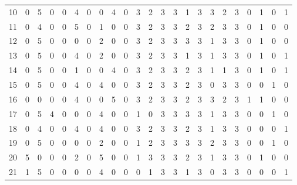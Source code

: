 \begin{table}[htbp]
{\begin{tabular}{lllllllllllllllllllllll}
10                  & 0 & 5 & 0 & 0 & 4 & 0 & 0 & 4 & 0 & 3 & 2 & 3 & 3 & 1 & 3 & 3 & 2 & 3 & 0                  & 1                   & 0                   & 1                   \\
11                  & 0 & 4 & 0 & 0 & 5 & 0 & 1 & 0 & 0 & 3 & 2 & 3 & 3 & 2 & 3 & 2 & 3 & 3 & 0                  & 1                   & 0                   & 0                   \\
12                  & 0 & 5 & 0 & 0 & 0 & 0 & 2 & 0 & 0 & 3 & 2 & 3 & 3 & 3 & 3 & 1 & 3 & 3 & 0                  & 1                   & 0                   & 0                   \\
13                  & 0 & 5 & 0 & 0 & 4 & 0 & 2 & 0 & 0 & 3 & 2 & 3 & 3 & 1 & 3 & 1 & 3 & 3 & 0                  & 1                   & 0                   & 1                   \\
14                  & 0 & 5 & 0 & 0 & 1 & 0 & 0 & 4 & 0 & 3 & 2 & 3 & 3 & 2 & 3 & 1 & 1 & 3 & 0                  & 1                   & 0                   & 1                   \\
15                  & 0 & 5 & 0 & 0 & 4 & 0 & 4 & 0 & 0 & 3 & 2 & 3 & 3 & 2 & 3 & 0 & 3 & 3 & 0                  & 0                   & 1                   & 0                   \\
16                  & 0 & 0 & 0 & 0 & 4 & 0 & 0 & 5 & 0 & 3 & 2 & 3 & 3 & 2 & 3 & 3 & 2 & 3 & 1                  & 1                   & 0                   & 0                   \\
17                  & 0 & 5 & 4 & 0 & 0 & 0 & 4 & 0 & 0 & 1 & 0 & 3 & 3 & 3 & 3 & 1 & 3 & 3 & 0                  & 0                   & 1                   & 0                   \\
18                  & 0 & 4 & 0 & 0 & 4 & 0 & 4 & 0 & 0 & 3 & 2 & 3 & 3 & 2 & 3 & 1 & 3 & 3 & 0                  & 0                   & 0                   & 1                   \\
19                  & 0 & 5 & 0 & 0 & 0 & 0 & 2 & 0 & 0 & 1 & 2 & 3 & 3 & 3 & 3 & 2 & 3 & 3 & 0                  & 0                   & 1                   & 0                   \\
20                  & 5 & 0 & 0 & 0 & 2 & 0 & 5 & 0 & 0 & 1 & 3 & 3 & 3 & 2 & 3 & 1 & 3 & 3 & 0                  & 1                   & 0                   & 0                   \\
21                  & 1 & 5 & 0 & 0 & 0 & 0 & 4 & 0 & 0 & 0 & 1 & 3 & 3 & 1 & 3 & 0 & 3 & 3 & 0                  & 0                   & 0                   & 1                   \\

\end{tabular}}
\end{table}

